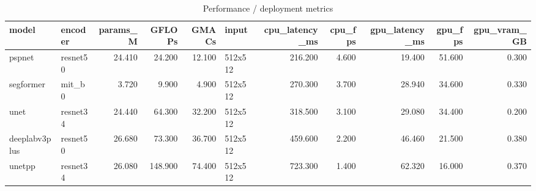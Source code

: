 \begin{table}
\caption{Performance / deployment metrics}
\begin{tabular}{llrrrlrrrrr}
\toprule
model & encoder & params_M & GFLOPs & GMACs & input & cpu_latency_ms & cpu_fps & gpu_latency_ms & gpu_fps & gpu_vram_GB \\
\midrule
pspnet & resnet50 & 24.410 & 24.200 & 12.100 & 512x512 & 216.200 & 4.600 & 19.400 & 51.600 & 0.300 \\
segformer & mit_b0 & 3.720 & 9.900 & 4.900 & 512x512 & 270.300 & 3.700 & 28.940 & 34.600 & 0.330 \\
unet & resnet34 & 24.440 & 64.300 & 32.200 & 512x512 & 318.500 & 3.100 & 29.080 & 34.400 & 0.200 \\
deeplabv3plus & resnet50 & 26.680 & 73.300 & 36.700 & 512x512 & 459.600 & 2.200 & 46.460 & 21.500 & 0.380 \\
unetpp & resnet34 & 26.080 & 148.900 & 74.400 & 512x512 & 723.300 & 1.400 & 62.320 & 16.000 & 0.370 \\
\bottomrule
\end{tabular}
\end{table}
